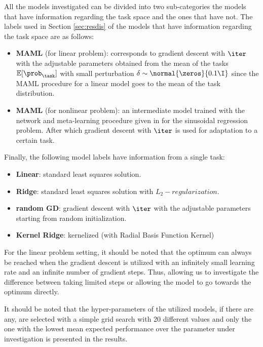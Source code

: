 All the models investigated can be divided into two sub-categories the models that have information regarding the task space and the ones that have not. The labels  used in Section \ref{sec:resdis} of the models that have information regarding the task space are as follows:
\begin{itemize}
  \item \textbf{MAML} (for linear problem): corresponds to gradient descent with $\iter$ with the adjustable parameters obtained from the mean of the tasks $\mathbb{E}[\prob_{\task}]$ with small perturbation $\delta\sim\normal{\zeros}{0.1\I}$ since the MAML procedure for a linear model goes to the mean of the task distribution. 
  \item \textbf{MAML} (for nonlinear problem): an intermediate model trained with the network and meta-learning procedure  given in \cite{finn2017} for the sinusoidal regression problem. After which gradient descent with $\iter$ is used for adaptation to a certain task.
\end{itemize} 

Finally, the following model labels have information from a single task:
\begin{itemize}
  \item \textbf{Linear}: standard least squares solution.
  \item \textbf{Ridge}: standard least squares solution with $L_2-regularization$.
  \item \textbf{random GD}: gradient descent with $\iter$ with the adjustable parameters starting from random initialization.
  \item \textbf{Kernel Ridge}: kernelized (with Radial Basis Function Kernel) 
\end{itemize}

For the linear problem setting, it should be noted that the optimum can always be reached when the gradient descent is utilized with an infinitely small learning rate and an infinite number of gradient steps. Thus, allowing us to investigate the difference between taking limited steps or allowing the model to go towards the optimum directly.

It should be noted that the hyper-parameters of the utilized models, if there are any, are selected with a simple grid search with 20 different values and only the one with the lowest mean expected performance over the parameter under investigation is presented in the results. 
